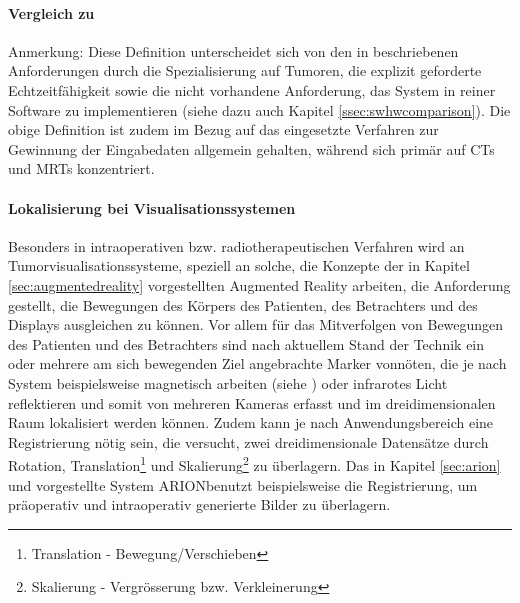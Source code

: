 \documentclass[pdftex,a4paper,titlepage,12pt]{scrartcl}
\newtheorem[L]{boxedDefinition}{Definition}
\newcommand{\paranl}{$~~$\\}
\begin{document}
\paragraph{Vergleich zu \cite[Kapitel 3.1.1, Seite 17f.]{Bruckner2004}}\paranl\label{p:bru04comparison}
Anmerkung: Diese Definition unterscheidet sich von den in \cite[Kapitel 3.1.1, Seite 17]{Bruckner2004} beschriebenen Anforderungen durch die Spezialisierung auf Tumoren, die explizit geforderte Echtzeitfähigkeit sowie die nicht vorhandene Anforderung, das System in reiner Software zu implementieren (siehe dazu auch Kapitel \vref{ssec:swhwcomparison}). Die obige Definition ist zudem im Bezug auf das eingesetzte Verfahren zur Gewinnung der Eingabedaten allgemein gehalten, während \cite{Bruckner2004} sich primär auf CTs und MRTs konzentriert.

\paragraph{Lokalisierung bei Visualisationssystemen}
Besonders in intraoperativen bzw. radiotherapeutischen Verfahren wird an Tumorvisualisationssysteme, speziell an solche, die Konzepte der in Kapitel \ref{sec:augmentedreality} vorgestellten Augmented Reality arbeiten, die Anforderung gestellt, die Bewegungen des Körpers des Patienten, des Betrachters und des Displays ausgleichen zu können. Vor allem für das Mitverfolgen von Bewegungen des Patienten und des Betrachters sind nach aktuellem Stand der Technik ein oder mehrere am sich bewegenden Ziel angebrachte Marker vonnöten, die je nach System beispielsweise magnetisch arbeiten (siehe \cite{Suthau2002DE}) oder infrarotes Licht reflektieren und somit von mehreren Kameras erfasst und im dreidimensionalen Raum lokalisiert werden können. Zudem kann je nach Anwendungsbereich eine Registrierung nötig sein, die versucht, zwei dreidimensionale Datensätze durch Rotation, Translation\footnote{Translation - Bewegung/Verschieben} und Skalierung\footnote{Skalierung - Vergrösserung bzw. Verkleinerung} zu überlagern. Das in Kapitel \vref{sec:arion} und \cite{Suthau2002DE} vorgestellte System ARION\texttrademark benutzt beispielsweise die Registrierung, um präoperativ und intraoperativ generierte Bilder zu überlagern. 
 
\end{document}
